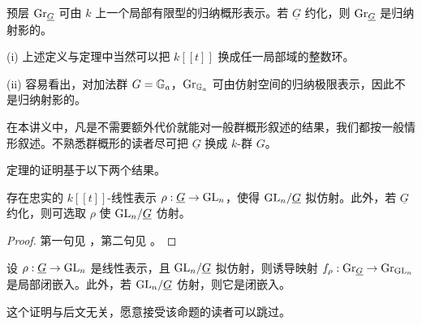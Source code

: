 \begin{thm}\label{I:rep aff}
预层 ${\operatorname{Gr}}_{\underline G}$ 可由 $k$ 上一个局部有限型的归纳概形表示。若 $\underline G$ 约化，则 ${\operatorname{Gr}}_{\underline G}$ 是归纳射影的。
\end{thm}

\begin{rmk}
(i) 上述定义与定理中当然可以把 $k[[t]]$ 换成任一局部域的整数环。

(ii) 容易看出，对加法群 $G={\mathbb G}_a$，${\operatorname{Gr}}_{{\mathbb G}_a}$ 可由仿射空间的归纳极限表示，因此不是归纳射影的。
\end{rmk}

\begin{rmk}在本讲义中，凡是不需要额外代价就能对一般群概形叙述的结果，我们都按一般情形叙述。不熟悉群概形的读者尽可把 $\underline G$ 换成 $k$-群 $G$。
\end{rmk}

定理的证明基于以下两个结果。

\begin{prop}\label{lin rep}
存在忠实的 $k[[t]]$-线性表示 $\rho: \underline G\to {\operatorname{GL}}_n$，使得 ${\operatorname{GL}}_n/\underline G$ 拟仿射。此外，若 $\underline G$ 约化，则可选取 $\rho$ 使 ${\operatorname{GL}}_n/\underline G$ 仿射。
\end{prop}

\begin{proof}第一句见 \cite[Proposition 1.3]{PR}，第二句见 \cite[Corollary 9.7.7]{Ap}。
\end{proof}

\begin{prop}\label{gen G}
设 $\rho:\underline G\to {\operatorname{GL}}_n$ 是线性表示，且 ${\operatorname{GL}}_n/\underline G$ 拟仿射，则诱导映射 $f_\rho:{\operatorname{Gr}}_{\underline G}\to {\operatorname{Gr}}_{{\operatorname{GL}}_n}$ 是局部闭嵌入。此外，若 ${\operatorname{GL}}_n/\underline G$ 仿射，则它是闭嵌入。
\end{prop}

这个证明与后文无关，愿意接受该命题的读者可以跳过。

